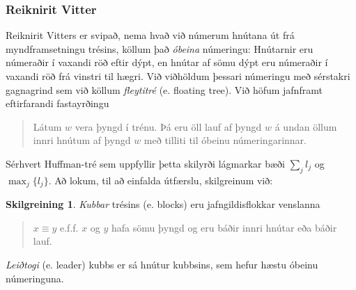 \documentclass[a4paper,icelandic]{article}
\theoremstyle{default}
\theoremstyle{definition}
\newtheorem{skilgr}{Skilgreining}[section]
\theoremstyle{remark}
\begin{document}
\subsubsection{Reiknirit Vitter}

Reiknirit Vitters er svipað, nema hvað við númerum hnútana út frá
myndframsetningu trésins, köllum það \emph{óbeina} númeringu: Hnútarnir
eru númeraðir í vaxandi röð eftir dýpt, en hnútar af sömu dýpt eru
númeraðir í vaxandi röð frá vinstri til hægri. Við viðhöldum þessari
númeringu með sérstakri gagnagrind sem við köllum \emph{fleytitré} (e.
floating tree). Við höfum jafnframt eftirfarandi fastayrðingu
\begin{quote}
  Látum $w$ vera þyngd í trénu. Þá eru öll lauf af þyngd $w$
  á undan öllum innri hnútum af þyngd $w$ með tilliti til óbeinu
  númeringarinnar.
\end{quote}
Sérhvert Huffman-tré sem uppfyllir þetta skilyrði lágmarkar bæði
$\sum_{j} l_j$ og $\max_j\{l_j\}$. Að lokum, til að einfalda útfærslu,
skilgreinum við:
\begin{skilgr}
  \emph{Kubbar} trésins (e. blocks) eru jafngildisflokkar venslanna
  \begin{quote}
    $x\equiv y$ e.f.f. $x$ og $y$ hafa sömu þyngd og eru báðir innri
    hnútar eða báðir lauf.
  \end{quote}
  \emph{Leiðtogi} (e. leader) kubbs er sá hnútur kubbsins, sem hefur
  hæstu óbeinu númeringuna.
\end{skilgr}
\end{document}
